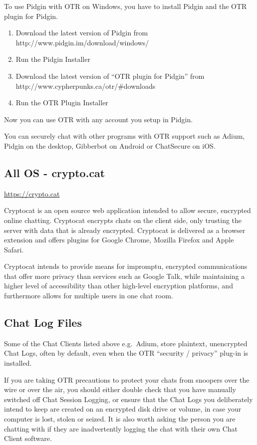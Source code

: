 To use Pidgin with OTR on Windows, you have to install Pidgin and the
OTR plugin for Pidgin.

\begin{enumerate}[1.]
\item
  Download the latest version of Pidgin from
  http://www.pidgin.im/download/windows/
\item
  Run the Pidgin Installer
\item
  Download the latest version of ``OTR plugin for Pidgin'' from
  http://www.cypherpunks.ca/otr/\#downloads
\item
  Run the OTR Plugin Installer
\end{enumerate}
Now you can use OTR with any account you setup in Pidgin.

You can securely chat with other programs with OTR support such as
Adium, Pidgin on the desktop, Gibberbot on Android or ChatSecure on iOS.

\subsection{All OS - crypto.cat}

\href{https://crypto.cat}{https://crypto.cat}

Cryptocat is an open source web application intended to allow secure,
encrypted online chatting. Cryptocat encrypts chats on the client side,
only trusting the server with data that is already encrypted. Cryptocat
is delivered as a browser extension and offers plugins for Google
Chrome, Mozilla Firefox and Apple Safari.

Cryptocat intends to provide means for impromptu, encrypted
communications that offer more privacy than services such as Google
Talk, while maintaining a higher level of accessibility than other
high-level encryption platforms, and furthermore allows for multiple
users in one chat room.

\subsection{Chat Log Files}

Some of the Chat Clients listed above e.g.~Adium, store plaintext,
unencrypted Chat Logs, often by default, even when the OTR ``security /
privacy'' plug-in is installed.

If you are taking OTR precautions to protect your chats from snoopers
over the wire or over the air, you should either double check that you
have manually switched off Chat Session Logging, or ensure that the Chat
Logs you deliberately intend to keep are created on an encrypted disk
drive or volume, in case your computer is lost, stolen or seized. It is
also worth asking the person you are chatting with if they are
inadvertently logging the chat with their own Chat Client software.

